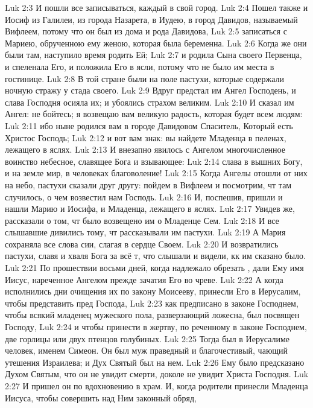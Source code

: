 \vs Luk 2:3 И пошли все записываться, каждый в свой город.
\vs Luk 2:4 Пошел также и Иосиф из Галилеи, из города Назарета, в Иудею, в город Давидов, называемый Вифлеем, потому что он был из дома и рода Давидова,
\vs Luk 2:5 записаться с Мариею, обрученною ему женою, которая была беременна.
\vs Luk 2:6 Когда же они были там, наступило время родить Ей;
\vs Luk 2:7 и родила Сына своего Первенца, и спеленала Его, и положила Его в ясли, потому что не было им места в гостинице.
\rsbpar\vs Luk 2:8 В той стране были на поле пастухи, которые содержали ночную стражу у стада своего.
\vs Luk 2:9 Вдруг предстал им Ангел Господень, и слава Господня осияла их; и убоялись страхом великим.
\vs Luk 2:10 И сказал им Ангел: не бойтесь; я возвещаю вам великую радость, которая будет всем людям:
\vs Luk 2:11 ибо ныне родился вам в городе Давидовом Спаситель, Который есть Христос Господь;
\vs Luk 2:12 и вот вам знак: вы найдете Младенца в пеленах, лежащего в яслях.
\vs Luk 2:13 И внезапно явилось с Ангелом многочисленное воинство небесное, славящее Бога и взывающее:
\vs Luk 2:14 слава в вышних Богу, и на земле мир, в человеках благоволение!
\vs Luk 2:15 Когда Ангелы отошли от них на небо, пастухи сказали друг другу: пойдем в Вифлеем и посмотрим, чт там случилось, о чем возвестил нам Господь.
\vs Luk 2:16 И, поспешив, пришли и нашли Марию и Иосифа, и Младенца, лежащего в яслях.
\vs Luk 2:17 Увидев же, рассказали о том, чт было возвещено им о Младенце Сем.
\vs Luk 2:18 И все слышавшие дивились тому, чт рассказывали им пастухи.
\vs Luk 2:19 А Мария сохраняла все слова сии, слагая в сердце Своем.
\vs Luk 2:20 И возвратились пастухи, славя и хваля Бога за всё т, что слышали и видели, кк им сказано было.
\rsbpar\vs Luk 2:21 По прошествии восьми дней, когда надлежало обрезать , дали Ему имя Иисус, нареченное Ангелом прежде зачатия Его во чреве.
\rsbpar\vs Luk 2:22 А когда исполнились дни очищения их по закону Моисееву, принесли Его в Иерусалим, чтобы представить пред Господа,
\vs Luk 2:23 как предписано в законе Господнем, чтобы всякий младенец мужеского пола, разверзающий ложесна, был посвящен Господу,
\vs Luk 2:24 и чтобы принести в жертву, по реченному в законе Господнем, две горлицы или двух птенцов голубиных.
\vs Luk 2:25 Тогда был в Иерусалиме человек, именем Симеон. Он был муж праведный и благочестивый, чающий утешения Израилева; и Дух Святый был на нем.
\vs Luk 2:26 Ему было предсказано Духом Святым, что он не увидит смерти, доколе не увидит Христа Господня.
\vs Luk 2:27 И пришел он по вдохновению в храм. И, когда родители принесли Младенца Иисуса, чтобы совершить над Ним законный обряд,
